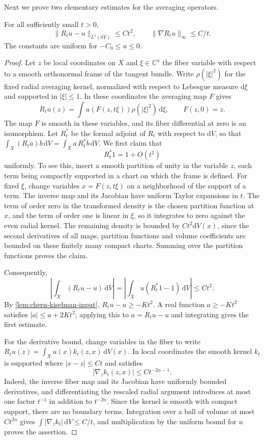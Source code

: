 Next we prove two elementary estimates for the averaging operators.

\begin{lemma}\label{lem:chern-smoothing-integral}
For all sufficiently small $t>0$,
\[
 \|R_tu-u\|_{L^1(\mathrm{d}V)}\leq Ct^2,
 \qquad \|\nabla R_tu\|_\infty\leq C/t.
\]
The constants are uniform for $-C_0\leq u\leq0$.
\end{lemma}
\begin{proof}
Let $z$ be local coordinates on $X$ and $\xi\in\mathbb C^n$ the fiber variable with respect to a smooth orthonormal frame of the tangent bundle. Write $\rho(|\xi|^2)$ for the fixed radial averaging kernel, normalized with respect to Lebesgue measure $\mathrm{d}\xi$ and supported in $|\xi|\leq1$. In these coordinates the averaging map $F$ gives
\[
 R_tu(z)=\int u(F(z,t\xi))\rho(|\xi|^2)\,\mathrm{d}\xi,
 \qquad F(z,0)=z.
\]
The map $F$ is smooth in these variables, and its fiber differential at zero is an isomorphism. Let $R_t^*$ be the formal adjoint of $R_t$ with respect to $\mathrm{d}V$, so that $\int_X(R_ta)b\,\mathrm{d}V=\int_Xa\,R_t^*b\,\mathrm{d}V$. We first claim that
\[
 R_t^*1=1+O(t^2)
\]
uniformly. To see this, insert a smooth partition of unity in the variable $z$, each term being compactly supported in a chart on which the frame is defined. For fixed $\xi$, change variables $x=F(z,t\xi)$ on a neighborhood of the support of a term. The inverse map and its Jacobian have uniform Taylor expansions in $t$. The term of order zero in the transformed density is the chosen partition function at $x$, and the term of order one is linear in $\xi$, so it integrates to zero against the even radial kernel. The remaining density is bounded by $Ct^2\mathrm{d}V(x)$, since the second derivatives of all maps, partition functions and volume coefficients are bounded on these finitely many compact charts. Summing over the partition functions proves the claim.

Consequently,
\[
 \left|\int_X(R_tu-u)\,\mathrm{d}V\right|
  =\left|\int_Xu(R_t^*1-1)\,\mathrm{d}V\right|\leq Ct^2.
\]
By \cref{lem:chern-kiselman-input}, $R_tu-u\geq-Kt^2$. A real function $a\geq-Kt^2$ satisfies $|a|\leq a+2Kt^2$; applying this to $a=R_tu-u$ and integrating gives the first estimate.

For the derivative bound, change variables in the fiber to write $R_tu(z)=\int_Xu(x)k_t(z,x)\,\mathrm{d}V(x)$. In local coordinates the smooth kernel $k_t$ is supported where $|x-z|\leq Ct$ and satisfies
\[
 |\nabla_z k_t(z,x)|\leq Ct^{-2n-1}.
\]
Indeed, the inverse fiber map and its Jacobian have uniformly bounded derivatives, and differentiating the rescaled radial argument introduces at most one factor $t^{-1}$ in addition to $t^{-2n}$. Since the kernel is smooth with compact support, there are no boundary terms. Integration over a ball of volume at most $Ct^{2n}$ gives $\int|\nabla_zk_t|\,\mathrm{d}V\leq C/t$, and multiplication by the uniform bound for $u$ proves the assertion.
\end{proof}

